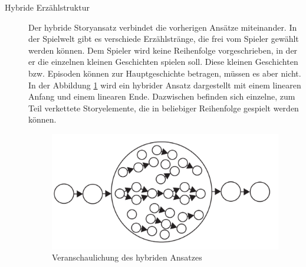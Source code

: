 \begin{description}
\item[Hybride Erzählstruktur]
Der hybride Storyansatz verbindet die vorherigen Ansätze miteinander. In der Spielwelt gibt es verschiede Erzählstränge, die frei vom Spieler gewählt werden können. Dem Spieler wird keine Reihenfolge vorgeschrieben, in der er die einzelnen kleinen Geschichten spielen soll. Diese kleinen Geschichten bzw. Episoden können zur Hauptgeschichte betragen, müssen es aber nicht. \\
In der Abbildung \ref{pic:storyHybrid} wird ein hybrider Ansatz dargestellt mit einem linearen Anfang und einem linearen Ende. Dazwischen befinden sich einzelne, zum Teil verkettete Storyelemente, die in beliebiger Reihenfolge gespielt werden können.
 
\cite[S. 100 f.]{Adams:1515529}


\begin{figure}[H]
    \centering
    \includegraphics[width=.8\textwidth]{files/story/storyTeile}
    \caption{Veranschaulichung des hybriden Ansatzes}
    \label{pic:storyHybrid}
\end{figure} 









\end{description}

\pagebreak

